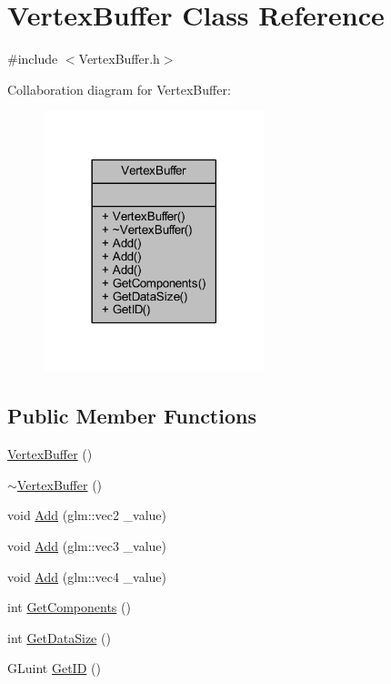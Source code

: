 \hypertarget{class_vertex_buffer}{}\section{Vertex\+Buffer Class Reference}
\label{class_vertex_buffer}


{\ttfamily \#include $<$Vertex\+Buffer.\+h$>$}



Collaboration diagram for Vertex\+Buffer\+:
\nopagebreak
\begin{figure}[H]
\begin{center}
\leavevmode
\includegraphics[width=182pt]{class_vertex_buffer__coll__graph}
\end{center}
\end{figure}
\subsection*{Public Member Functions}
\begin{DoxyCompactItemize}
\item 
\mbox{\hyperlink{class_vertex_buffer_adb25d82a47ad82d5b69a75ac111401b8}{Vertex\+Buffer}} ()
\item 
\mbox{\hyperlink{class_vertex_buffer_a5216726fdd43b2ae8e1439e347717fdd}{$\sim$\+Vertex\+Buffer}} ()
\item 
void \mbox{\hyperlink{class_vertex_buffer_ac184944124f0496e2df432d09529cfb8}{Add}} (glm\+::vec2 \+\_\+value)
\item 
void \mbox{\hyperlink{class_vertex_buffer_a4e777f9d6b55c794e2c325ac78e65260}{Add}} (glm\+::vec3 \+\_\+value)
\item 
void \mbox{\hyperlink{class_vertex_buffer_ae5e3477013c5077ef79e5a61b990f0a0}{Add}} (glm\+::vec4 \+\_\+value)
\item 
int \mbox{\hyperlink{class_vertex_buffer_a214c873c9266454c86ecff510fa0625a}{Get\+Components}} ()
\item 
int \mbox{\hyperlink{class_vertex_buffer_a5fce06eb2e00088163f3217b139cc460}{Get\+Data\+Size}} ()
\item 
G\+Luint \mbox{\hyperlink{class_vertex_buffer_a1f73043d77c8680af3eb9ddf8250ec35}{Get\+ID}} ()
\end{DoxyCompactItemize}


